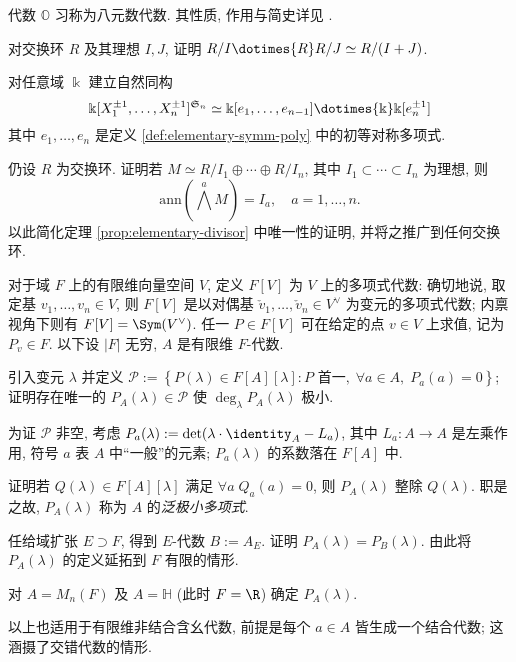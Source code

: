 \begin{Exercises}
\begin{enumerate}[(i)]
		\end{enumerate}
		代数 $\mathbb{O}$ 习称为八元数代数. 其性质, 作用与简史详见 \cite{Baez02}. 
	\item 对交换环 $R$ 及其理想 $I, J$, 证明 $R/I \dotimes{R} R/J \simeq R/(I+J)$.
	\item 对任意域 $\Bbbk$ 建立自然同构
		\[ \Bbbk[ X_1^{\pm 1}, \ldots, X_n^{\pm 1}]^{\mathfrak{S}_n} \simeq \Bbbk[e_1, \ldots, e_{n-1}] \dotimes{\Bbbk} \Bbbk[e_n^{\pm 1}] \]
		其中 $e_1, \ldots, e_n$ 是定义 \ref{def:elementary-symm-poly} 中的初等对称多项式.
	\item 仍设 $R$ 为交换环. 证明若 $M \simeq R/I_1 \oplus \cdots \oplus R/I_n$, 其中 $I_1 \subset \cdots \subset I_n$ 为理想, 则
		\[ \text{ann}\left( \bigwedge^a M \right) = I_a, \quad a=1, \ldots, n. \]
		以此简化定理 \ref{prop:elementary-divisor} 中唯一性的证明, 并将之推广到任何交换环.
	\item 对于域 $F$ 上的有限维向量空间 $V$, 定义 $F[V]$ 为 $V$ 上的多项式代数: 确切地说, 取定基 $v_1, \ldots, v_n \in V$, 则 $F[V]$ 是以对偶基 $\check{v}_1, \ldots, \check{v}_n \in V^\vee$ 为变元的多项式代数; 内禀视角下则有 $F[V] = \Sym(V^\vee)$. 任一 $P \in F[V]$ 可在给定的点 $v \in V$ 上求值, 记为 $P_v \in F$. 以下设 $|F|$ 无穷, $A$ 是有限维 $F$-代数.
		\begin{compactenum}[(i)]
			\item 引入变元 $\lambda$ 并定义 $\mathcal{P} := \left\{ P(\lambda) \in F[A][\lambda] : P \text{ 首一}, \; \forall a \in A, \; P_a(a)=0 \right\}$; 证明存在唯一的 $P_A(\lambda) \in \mathcal{P}$ 使 $\deg_\lambda P_A(\lambda)$ 极小.
			\begin{hint}
				为证 $\mathcal{P}$ 非空, 考虑 $P_a(\lambda) := \det(\lambda \cdot \identity_A - L_a)$, 其中 $L_a: A \to A$ 是左乘作用, 符号 $a$ 表 $A$ 中``一般''的元素; $P_a(\lambda)$ 的系数落在 $F[A]$ 中.
			\end{hint}
			\item 证明若 $Q(\lambda) \in F[A][\lambda]$ 满足 $\forall a \; Q_a(a)=0$, 则 $P_A(\lambda)$ 整除 $Q(\lambda)$. 职是之故, $P_A(\lambda)$ 称为 $A$ 的\emph{泛极小多项式}.
			\item 任给域扩张 $E \supset F$, 得到 $E$-代数 $B := A_E$. 证明 $P_A(\lambda) = P_B(\lambda)$. 由此将 $P_A(\lambda)$ 的定义延拓到 $F$ 有限的情形.
			\item 对 $A = M_n(F)$ 及 $A = \mathbb{H}$ (此时 $F=\R$) 确定 $P_A(\lambda)$.
		\end{compactenum}
		以上也适用于有限维非结合含幺代数, 前提是每个 $a \in A$ 皆生成一个结合代数; 这涵摄了交错代数的情形.

\end{Exercises}
